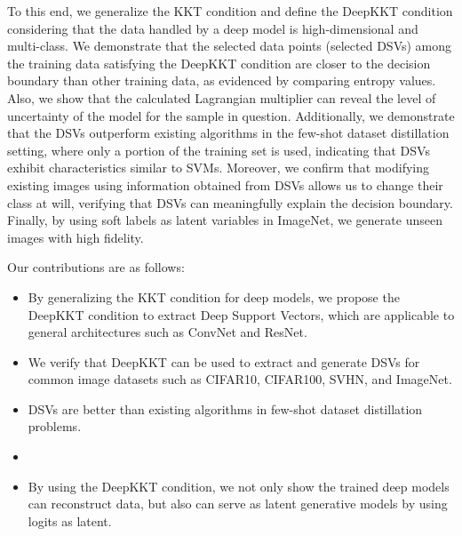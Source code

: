 {{To this end, we generalize the KKT condition and define the DeepKKT condition considering that the data handled by a deep model is high-dimensional and multi-class. 
We demonstrate that the selected data points (selected DSVs) among the training data satisfying the DeepKKT condition are closer to the decision boundary than other training data, as evidenced by comparing entropy values.
Also, we show that the calculated Lagrangian multiplier can reveal the level of uncertainty of the model for the sample in question. %
Additionally, we demonstrate that the  DSVs outperform existing algorithms in the few-shot dataset distillation setting, where only a portion of the training set is used, indicating that DSVs exhibit characteristics similar to SVMs. Moreover, we confirm that modifying existing images using information obtained from DSVs allows us to change their class at will, verifying that DSVs can meaningfully explain the decision boundary. Finally, by using soft labels as latent variables in ImageNet, we generate unseen images with high fidelity.


Our contributions are as follows:

\begin{itemize}[leftmargin=*]
    \item By generalizing the KKT condition for deep models, we propose the DeepKKT condition to extract Deep Support Vectors, which are applicable to general architectures such as ConvNet and ResNet.
    \item We verify that DeepKKT can be used to extract and generate DSVs for common image datasets such as CIFAR10, CIFAR100, SVHN, and ImageNet.
    \item DSVs are better than existing algorithms in few-shot dataset distillation problems. %
    \item {}
    \item By using the DeepKKT condition, we not only show the trained deep models can reconstruct data, but also can serve as latent generative models by using logits as latent.
\end{itemize}

}}
